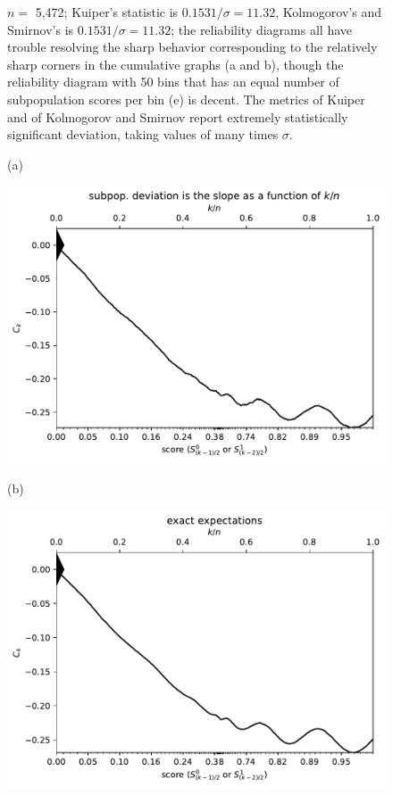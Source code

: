 \documentclass{article}
\newlength{\imsize}
\begin{document}
\begin{figure}
\begin{centering}
\end{centering}
\caption{$n =$ 5,472; Kuiper's statistic is $0.1531 / \sigma = 11.32$,
         Kolmogorov's and Smirnov's is $0.1531 / \sigma = 11.32$;
         the reliability diagrams all have trouble resolving the sharp behavior
         corresponding to the relatively sharp corners in the cumulative graphs
         (a and b), though the reliability diagram with 50 bins that
         has an equal number of subpopulation scores per bin (e) is decent.
         The metrics of Kuiper and of Kolmogorov and Smirnov
         report extremely statistically significant deviation,
         taking values of many times $\sigma$.
}
\label{ex1}
\end{figure}


\begin{figure}
\begin{centering}

(a)
\parbox{\imsize}{\includegraphics[width=\imsize]
{../codes/unweighted/10000_7000_10_2/cumulative.pdf}}
\quad\quad
(b)
\parbox{\imsize}{\includegraphics[width=\imsize]
{../codes/unweighted/10000_7000_10_2/cumulative_exact.pdf}}


\end{centering}
\end{figure}
\end{document}
